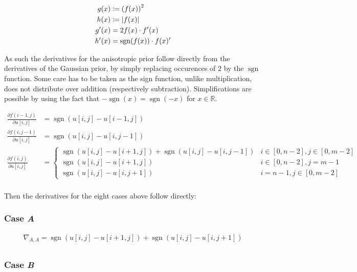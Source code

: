 \documentclass[a4paper]{scrreprt}
\DeclarePairedDelimiter\abs{\lvert}{\rvert}
\DeclareMathOperator{\sgn}{sgn}
\begin{document}
\begin{align*}
		g(x) & \coloneqq \left(f(x)\right)^2 \\
		h(x) & \coloneqq \abs*{f(x)} \\
		g'(x) & = 2 f(x) \cdot f'(x) \\
		h'(x) & = \sgn(f(x)) \cdot f(x)'
\end{align*}

As such the derivatives for the anisotropic prior follow directly from the
derivatives of the Gaussian prior, by simply replacing occurences of $2$ by the
$\sgn$ function. Some care has to be taken as the sign function, unlike
multiplication, does not distribute over addition (respectively subtraction).
Simplifications are possible by using the fact that $-\sgn(x) = \sgn(-x)$ for $x
\in \mathbb{R}$.

\begin{align*}
		\frac{\partial f(i - 1, j)}{\partial u[i, j]} & =
		  \sgn(u[i, j] - u[i - 1, j]) \\
		\frac{\partial f(i, j - 1)}{\partial u[i, j]} & =
		  \sgn(u[i, j] - u[i, j - 1]) \\
		\frac{\partial f(i, j)}{\partial u[i, j]} & =
		  \begin{cases}
				  \sgn(u[i, j] - u[i + 1, j]) + \sgn(u[i, j] - u[i, j - 1])
				    & i \in [0, n - 2], j \in [0, m - 2] \\
				  \sgn(u[i, j] - u[i + 1, j])
				    & i \in [0, n - 2], j = m - 1 \\
				  \sgn(u[i, j] - u[i, j + 1])
					& i = n - 1, j \in [0, m - 2]
		  \end{cases} \\
\end{align*}

Then the derivatives for the eight cases above follow directly:

\subsubsection{Case \emph{A}}

\begin{align*}
		\nabla_{A, A} = 
		  \sgn(u[i, j] - u[i + 1, j]) + \sgn(u[i, j] - u[i, j + 1]) \\
\end{align*}

\subsubsection{Case \emph{B}}
\end{document}
